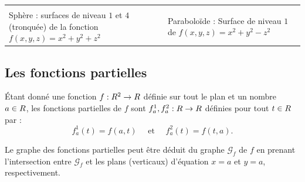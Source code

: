 \begin{exemple}
\begin{center}
\begin{tabular}{p{}p{}}
\begin{tikzpicture}
\begin{axis}
                \end{axis}
            \end{tikzpicture}\\												
            Sphère : surfaces de niveau $1$ et $4$ (tronquée) de la fonction $f(x,y,z) = x^2 + y^2 + z^2 $&
            Paraboloïde : Surface de niveau $1$ de  $f(x,y,z) = x^2 + y^2 - z^2$
        \end{tabular}
        \tikzexternaldisable
    \end{center}
\end{exemple}


\sld{\vfill\pagebreak[5]}%
\subsection{Les fonctions partielles}
\begin{definition}
    \'Etant donné une fonction $f:R^2 \to R$ définie sur tout le plan et un nombre $a\in R$, les fonctions partielles de $f$ sont $f^1_a,f^2_a : R\to R$ définies pour tout $t\in R$ par :
    \[
        f^1_a(t) = f(a,t) \quad \text{ et } \quad f^2_a(t) = f(t,a).
    \]
\end{definition}

Le graphe des fonctions partielles peut être déduit du graphe $\mathcal G_f$ de $f$ en prenant l'intersection entre $\mathcal G_f$ et les plans (verticaux) d'équation $x=a$ et $y=a$, respectivement.

